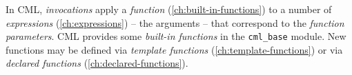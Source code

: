 In CML, \emph{invocations} apply a \emph{function} (\ref{ch:built-in-functions})
to a number of \emph{expressions} (\ref{ch:expressions})
-- the arguments --
that correspond to the \emph{function parameters}.
CML provides some \emph{built-in functions} in the \verb|cml_base| module.
New functions may be defined via
\emph{template functions} (\ref{ch:template-functions})
or via \emph{declared functions} (\ref{ch:declared-functions}).

